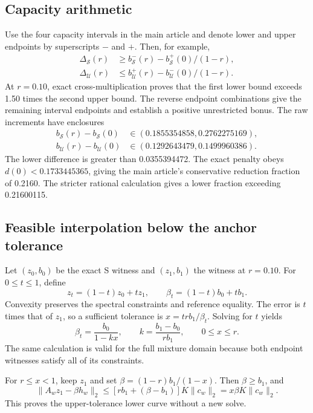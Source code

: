 \documentclass[9pt]{osa-supplemental-document}
\begin{document}
\subsection{Capacity arithmetic}
Use the four capacity intervals in the main article and denote lower and upper endpoints by superscripts $-$ and $+$. Then, for example,
\begin{align}
 \Delta_{\mathcal S}(r)&\geq b_{\mathcal S}^-(r)-b_{\mathcal S}^+(0)/(1-r),\\
 \Delta_{\mathcal U}(r)&\leq b_{\mathcal U}^+(r)-b_{\mathcal U}^-(0)/(1-r).
\end{align}
At $r=0.10$, exact cross-multiplication proves that the first lower bound exceeds 1.50 times the second upper bound. The reverse endpoint combinations give the remaining interval endpoints and establish a positive unrestricted bonus. The raw increments have enclosures
\begin{align}
 b_{\mathcal S}(r)-b_{\mathcal S}(0)&\in(0.1855354858,0.2762275169),\\
 b_{\mathcal U}(r)-b_{\mathcal U}(0)&\in(0.1292643479,0.1499960386).
\end{align}
The lower difference is greater than 0.0355394472. The exact penalty obeys $d(0)<0.1733445365$, giving the main article's conservative reduction fraction of 0.2160. The stricter rational calculation gives a lower fraction exceeding 0.21600115.

\subsection{Feasible interpolation below the anchor tolerance}
Let $(z_0,b_0)$ be the exact S witness and $(z_1,b_1)$ the witness at $r=0.10$. For $0\leq t\leq1$, define
\begin{equation}
 z_t=(1-t)z_0+tz_1,\qquad\beta_t=(1-t)b_0+tb_1.
\end{equation}
Convexity preserves the spectral constraints and reference equality. The error is $t$ times that of $z_1$, so a sufficient tolerance is $x=trb_1/\beta_t$. Solving for $t$ yields
\begin{equation}
 \beta_t=\frac{b_0}{1-kx},\qquad
 k=\frac{b_1-b_0}{rb_1},\qquad0\leq x\leq r.
 \label{eq:blendexact}
\end{equation}
The same calculation is valid for the full mixture domain because both endpoint witnesses satisfy all of its constraints.

For $r\leq x<1$, keep $z_1$ and set $\beta=(1-r)b_1/(1-x)$. Then $\beta\geq b_1$, and
\begin{equation}
 \|A_wz_1-\beta h_w\|_2
 \leq[rb_1+(\beta-b_1)]K\|c_w\|_2
 =x\beta K\|c_w\|_2.
\end{equation}
This proves the upper-tolerance lower curve without a new solve.
\end{document}
